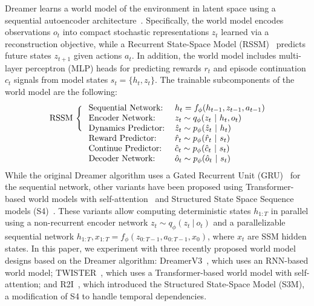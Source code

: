 Dreamer learns a world model of the environment in latent space using a sequential autoencoder architecture~\citep{hinton2006reducing, kingma2014auto, chung2015recurrent}. Specifically, the world model encodes observations $o_{t}$ into compact stochastic representations $z_{t}$ learned via a reconstruction objective, while a Recurrent State-Space Model (RSSM)~\citep{hafner2019learning} predicts future states $z_{t+1}$ given actions $a_{t}$. In addition, the world model includes multi-layer perceptron (MLP) heads for predicting rewards $r_{t}$ and episode continuation $c_{t}$ signals from model states $s_{t}=\{h_{t}, z_{t}\}$. The trainable subcomponents of the world model are the following:
\begin{equation}
\setlength{\tabcolsep}{3pt}
\begin{tabular}{llll}
    \multirow{3}{*}{RSSM $\begin{dcases*} \\ \\ \end{dcases*}$} & Sequential Network: &  & $h_{t} = f_{\phi}(h_{t-1}, z_{t-1}, a_{t-1})$    \\
    & Encoder Network: & & $z_{t} \sim q_{\phi}(z_{t}\ |\ h_{t}, o_{t})$   \\
    & Dynamics Predictor: & & $\hat{z}_{t} \sim p_{\phi}(\hat{z}_{t}\ |\ h_{t})$  \\
    & Reward Predictor: & & $\hat{r}_{t} \sim p_{\phi}(\hat{r}_{t}\ |\ s_{t})$ \\
    & Continue Predictor: & & $\hat{c}_{t} \sim p_{\phi}(\hat{c}_{t}\ |\ s_{t})$ \\
    & Decoder Network: & & $\hat{o}_{t} \sim p_{\phi}(\hat{o}_{t}\ |\ s_{t})$\\
\end{tabular}
\end{equation}
While the original Dreamer algorithm uses a Gated Recurrent Unit (GRU)~\citep{cho2014learning} for the sequential network, other variants have been proposed using Transformer-based world models with self-attention~\citep{vaswani2017attention} and Structured State Space Sequence models (S4)~\citep{gu2022efficiently}. These variants allow computing deterministic states $h_{1:T}$ in parallel using a non-recurrent encoder network $z_{t} \sim q_{\phi}(z_{t}\ |\ o_{t})$ and a parallelizable sequential network $h_{1:T}, x_{1:T}=f_{\phi}(z_{0:T-1}, a_{0:T-1}, x_{0})$, where $x_{t}$ are SSM hidden states.
In this paper, we experiment with three recently proposed world model designs based on the Dreamer algorithm: DreamerV3~\citep{hafner2023mastering}, which uses an RNN-based world model; TWISTER~\citep{burchi2025learning}, which uses a Transformer-based world model with self-attention; and R2I~\citep{samsami2024mastering}, which introduced the Structured State-Space Model (S3M), a modification of S4 to handle temporal dependencies.

